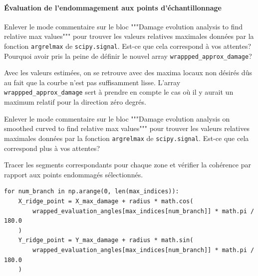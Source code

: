 \documentclass[french,12pt]{exam}
\begin{document}
\begin{questions}
\paragraph{Évaluation de l'endommagement aux points d'échantillonnage\\}

\question Enlever le mode commentaire sur le bloc """Damage evolution analysis to find relative max values""" pour trouver les valeurs relatives maximales données par la fonction \texttt{argrelmax} de \texttt{scipy.signal}. Est-ce que cela correspond à vos attentes? Pourquoi avoir pris la peine de définir le nouvel array \texttt{wrappped\_approx\_damage}?\\

\begin{solution}
Avec les valeurs estimées, on se retrouve avec des maxima locaux non désirés dûs au fait que la courbe n'est pas suffisamment lisse. L'array \texttt{wrappped\_approx\_damage} sert à prendre en compte le cas où il y aurait un maximum relatif pour la direction zéro degrés.\end{solution}



\question Enlever le mode commentaire sur le bloc """Damage evolution analysis on smoothed curved to find relative max values""" pour trouver les valeurs relatives maximales données par la fonction \texttt{argrelmax} de \texttt{scipy.signal}. Est-ce que cela correspond plus à vos attentes?

\question Tracer les segments correspondants pour chaque zone et vérifier la cohérence par rapport aux points endommagés sélectionnés.

\begin{solution}
\begin{lstlisting}
for num_branch in np.arange(0, len(max_indices)):
    X_ridge_point = X_max_damage + radius * math.cos(
        wrapped_evaluation_angles[max_indices[num_branch]] * math.pi / 180.0
    )
    Y_ridge_point = Y_max_damage + radius * math.sin(
        wrapped_evaluation_angles[max_indices[num_branch]] * math.pi / 180.0
    )      
\end{lstlisting}
\end{solution}
\end{questions}
\end{document}
